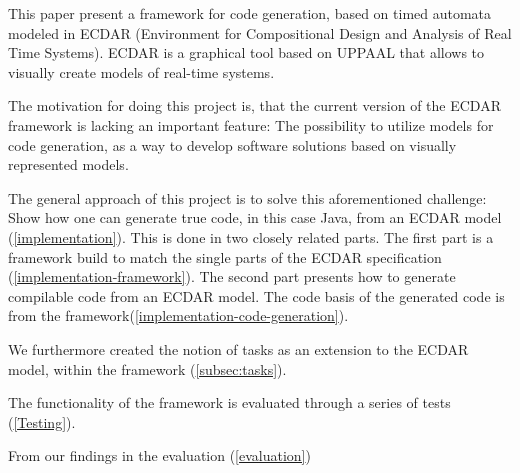 This paper present a framework for code generation, based on timed automata modeled in ECDAR (Environment for Compositional Design and Analysis of Real Time Systems). ECDAR is a graphical tool based on UPPAAL that allows to visually create models of real-time systems.

The motivation for doing this project is, that the current version of the ECDAR framework is lacking an important feature: The possibility to utilize models for code generation, as a way to develop software solutions based on visually represented models.

The general approach of this project is to solve this aforementioned challenge: Show how one can generate true code, in this case Java, from an ECDAR model (\ref{implementation}). This is done in two closely related parts. The first part is a framework build to match the single parts of the ECDAR specification (\ref{implementation-framework}). The second part presents how to generate compilable code from an ECDAR model. The code basis of the generated code is from the framework(\ref{implementation-code-generation}). 

We furthermore created the notion of tasks as an extension to the ECDAR model, within the framework (\ref{subsec:tasks}). 

The functionality of the framework is evaluated through a series of tests (\ref{Testing}). 

From our findings in the evaluation (\ref{evaluation}) 
